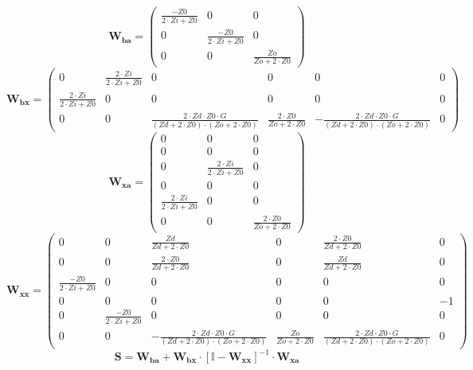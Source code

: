 \[ \mathbf{W_{ba}} = \left(\begin{smallmatrix} \frac{-Z0}{2\cdot Zi
+Z0} & 0 & 0 \\ 0 & \frac{-Z0}{2\cdot Zi +Z0} & 0 \\ 0 & 0 &
\frac{Zo}{Zo+2\cdot Z0} \end{smallmatrix}\right) \]
\[ \mathbf{W_{bx}} = \left(\begin{smallmatrix} 0 & \frac{2\cdot
Zi}{2\cdot Zi +Z0} & 0 & 0 & 0 & 0 \\ \frac{2\cdot Zi}{2\cdot Zi +Z0}
& 0 & 0 & 0 & 0 & 0 \\ 0 & 0 & \frac{2\cdot Zd\cdot Z0\cdot
G}{\left(Zd+2\cdot Z0\right)\cdot\left(Zo+2\cdot Z0\right)} &
\frac{2\cdot Z0}{Zo+2\cdot Z0} & -\frac{2\cdot Zd\cdot Z0\cdot
G}{\left(Zd+2\cdot Z0\right)\cdot\left(Zo+2\cdot Z0\right)} & 0
\end{smallmatrix}\right) \]
\[ \mathbf{W_{xa}} = \left(\begin{smallmatrix} 0 & 0 & 0 \\ 0 & 0 & 0
\\ 0 & \frac{2\cdot Zi}{2\cdot Zi +Z0} & 0 \\ 0 & 0 & 0 \\
\frac{2\cdot Zi}{2\cdot Zi +Z0} & 0 & 0 \\ 0 & 0 & \frac{2\cdot
Z0}{Zo+2\cdot Z0} \end{smallmatrix}\right) \]
\[ \mathbf{W_{xx}} = \left(\begin{smallmatrix} 0 & 0 &
\frac{Zd}{Zd+2\cdot Z0} & 0 & \frac{2\cdot Z0}{Zd+2\cdot Z0} & 0 \\ 0
& 0 & \frac{2\cdot Z0}{Zd+2\cdot Z0} & 0 & \frac{Zd}{Zd+2\cdot Z0} & 0
\\ \frac{-Z0}{2\cdot Zi +Z0} & 0 & 0 & 0 & 0 & 0 \\ 0 & 0 & 0 & 0 & 0
& -1 \\ 0 & \frac{-Z0}{2\cdot Zi +Z0} & 0 & 0 & 0 & 0 \\ 0 & 0 &
-\frac{2\cdot Zd\cdot Z0\cdot G}{\left(Zd+2\cdot
Z0\right)\cdot\left(Zo+2\cdot Z0\right)} & \frac{Zo}{Zo+2\cdot Z0} &
\frac{2\cdot Zd\cdot Z0\cdot G}{\left(Zd+2\cdot
Z0\right)\cdot\left(Zo+2\cdot Z0\right)} & 0 \end{smallmatrix}\right)
\]
\[ \mathbf{S}=\mathbf{W_{ba}}+\mathbf{W_{bx}}\cdot\left[ \mathbb{I}
-\mathbf{W_{xx}}\right]^{-1}\cdot\mathbf{W_{xa}} \]
